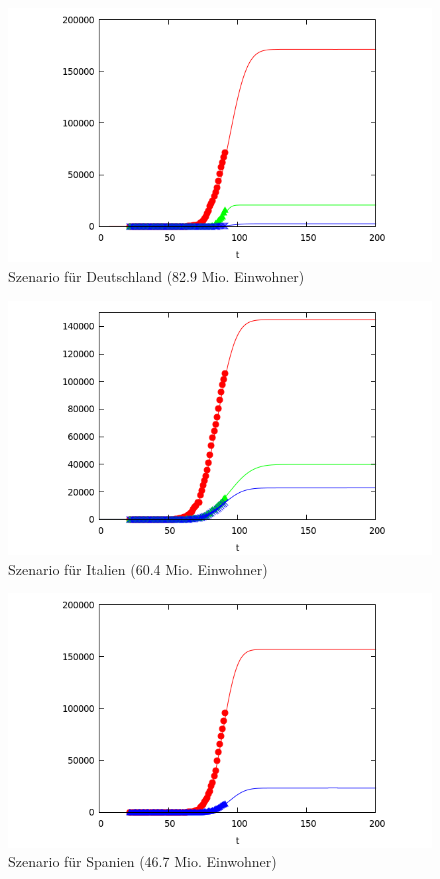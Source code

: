 \documentclass[a4paper,11pt]{article}
\begin{document}
\begin{figure}
  \begin{center}
    \includegraphics[width=.8\textwidth]{Germany.png}
    \caption{Szenario für Deutschland (82.9 Mio. Einwohner)}
  \end{center}
\end{figure}
\begin{figure}
  \begin{center}
  \includegraphics[width=.8\textwidth]{Italy.png}
    \caption{Szenario für Italien (60.4 Mio. Einwohner)}
  \end{center}
\end{figure}
\begin{figure}
  \begin{center}
  \includegraphics[width=.8\textwidth]{Spain.png}
    \caption{Szenario für Spanien (46.7 Mio. Einwohner)}
\end{center}
\end{figure}
\end{document}
